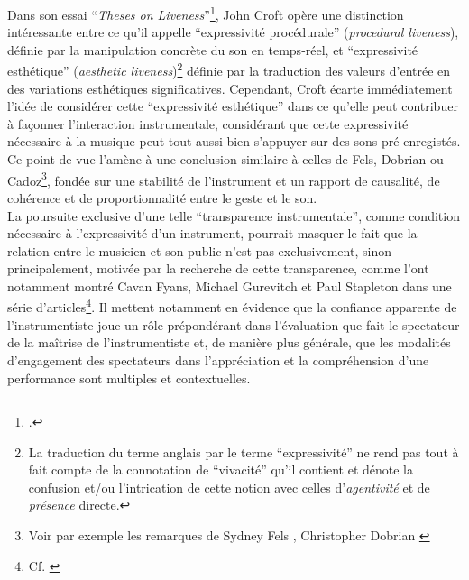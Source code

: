 \indent Dans son essai ``\textit{Theses on Liveness}''\footnote{\cite{croft_theses_2007}.}, John Croft opère une distinction intéressante entre ce qu'il appelle ``expressivité procédurale'' (\textit{procedural liveness}), définie par la manipulation concrète du son en temps-réel, et ``expressivité esthétique'' (\textit{aesthetic liveness})\footnote{La traduction du terme anglais  par le terme ``expressivité'' ne rend pas tout à fait compte de la connotation de ``vivacité'' qu'il contient et dénote la confusion et/ou l'intrication de cette notion avec celles d'\textit{agentivité} et de \textit{présence} directe.} définie par la traduction des valeurs d'entrée en des variations esthétiques significatives. Cependant, Croft écarte immédiatement l'idée de considérer cette ``expressivité esthétique'' dans ce qu'elle peut contribuer à façonner l'interaction instrumentale, considérant que cette expressivité nécessaire à la musique peut tout aussi bien s'appuyer sur des sons pré-enregistés. Ce point de vue l'amène à une conclusion similaire à celles de Fels, Dobrian ou Cadoz\footnote{Voir par exemple les remarques de Sydney Fels \cite{fels_mapping_2002} , Christopher Dobrian \cite{dobrian_e_2006} }, fondée sur une stabilité de l'instrument et un rapport de causalité, de cohérence et de proportionnalité entre le geste et le son.\\
\indent La poursuite exclusive d'une telle ``transparence instrumentale'', comme condition nécessaire à l'expressivité d'un instrument, pourrait masquer le fait que la relation entre le musicien et son public n'est pas exclusivement, sinon principalement, motivée par la recherche de cette transparence, comme l'ont notamment montré Cavan Fyans, Michael Gurevitch et Paul Stapleton dans une série d'articles\footnote{Cf. \cite{fyans_where_2009, fyans_examining_2010, gurevich_digital_2011}}. Il mettent notamment en évidence que la confiance apparente de l'instrumentiste joue un rôle prépondérant dans l'évaluation que fait le spectateur de la maîtrise de l'instrumentiste et, de manière plus générale, que les modalités d'engagement des spectateurs dans l'appréciation et la compréhension d'une performance sont multiples et contextuelles.\\
